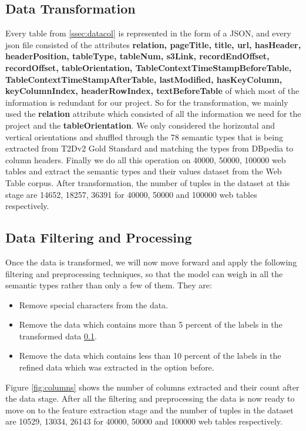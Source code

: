 \documentclass[12pt, a4paper]{report}
\theoremstyle{definition}
\numberwithin{equation}{chapter}
\numberwithin{figure}{chapter}
\numberwithin{table}{chapter}
\begin{document}
\begin{spacing}{1.5}
\subsection{Data Transformation}
\label{ssec:datatra}

Every table from \ref{ssec:datacol} is represented in the form of a JSON, and every json file consisted of the attributes \textbf{relation, pageTitle, title, url, hasHeader, headerPosition, tableType, tableNum, s3Link, recordEndOffset, recordOffset, tableOrientation, TableContextTimeStampBeforeTable, TableContextTimeStampAfterTable, lastModified, hasKeyColumn, keyColumnIndex, headerRowIndex, textBeforeTable} of which most of the information is redundant for our project. So for the transformation, we mainly used the \textbf{relation} attribute which consisted of all the information we need for the project and the \textbf{tableOrientation}. We only considered the horizontal and vertical orientations and shuffled through the 78 semantic types that is being extracted from T2Dv2 Gold Standard \cite{t2dv2} and matching the types from DBpedia \cite{dbpedia} to column headers. Finally we do all this operation on 40000, 50000, 100000 web tables and extract the semantic types and their values dataset from the Web Table corpus. After transformation, the number of tuples in the dataset at this stage are 14652, 18257, 36391 for 40000, 50000 and 100000 web tables respectively.

\subsection{Data Filtering and Processing}
\label{ssec:datafil}

Once the data is transformed, we will now move forward and apply the following filtering and preprocessing techniques, so that the model can weigh in all the semantic types rather than only a few of them. They are:

\begin{itemize}
\item Remove special characters from the data.
\item Remove the data which contains more than 5 percent of the labels in the transformed data \ref{ssec:datatra}. 
\item Remove the data which contains less than 10 percent of the labels in the refined data which was extracted in the option before.
\end{itemize}

\par
\setlength{\parskip}{2.2em}
\setlength{\parindent}{0em}
Figure \ref{fig:columns} shows the number of columns extracted and their count after the data stage. After all the filtering and preprocessing the data is now ready to move on to the feature extraction stage and the number of tuples in the dataset are 10529, 13034, 26143 for 40000, 50000 and 100000 web tables respectively.



\end{spacing}
\end{document}
